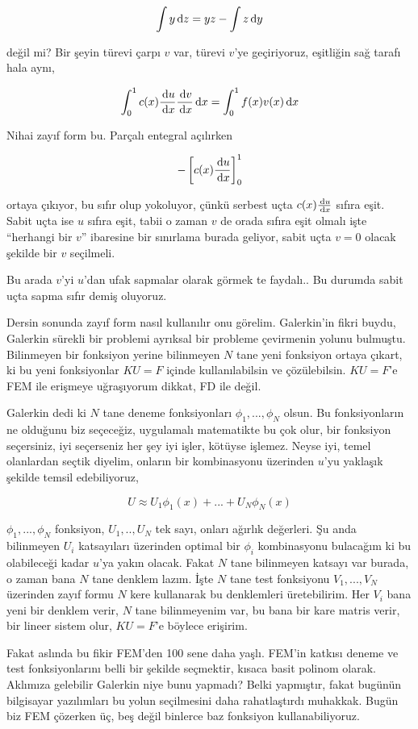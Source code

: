 \documentclass[12pt,fleqn]{article}\usepackage{../../common}
\begin{document}
$$ \int y \,\mathrm{d} z = y  z - \int z \,\mathrm{d} y $$

değil mi? Bir şeyin türevi çarpı $v$ var, türevi $v$'ye geçiriyoruz, eşitliğin
sağ tarafı hala aynı,

$$
\int _{0}^{1} c(x) \frac{\,\mathrm{d} u}{\,\mathrm{d} x} \frac{\,\mathrm{d} v}{\,\mathrm{d} x} \,\mathrm{d} x =
\int_{0}^{1} f(x) v(x) \,\mathrm{d} x
$$

Nihai zayıf form bu. Parçalı entegral açılırken

$$
- \left[ c(x) \frac{\,\mathrm{d} u}{\,\mathrm{d} x}  \right]_{0}^{1}
$$

ortaya çıkıyor, bu sıfır olup yokoluyor, çünkü serbest uçta $c(x) \frac{\,\mathrm{d} u}{\,\mathrm{d} x}$
sıfıra eşit. Sabit uçta ise $u$ sıfıra eşit, tabii o zaman $v$ de orada sıfıra
eşit olmalı işte ``herhangi bir $v$'' ibaresine bir sınırlama burada geliyor,
sabit uçta $v=0$ olacak şekilde bir $v$ seçilmeli.

Bu arada $v$'yi $u$'dan ufak sapmalar olarak görmek te faydalı.. Bu durumda
sabit uçta sapma sıfır demiş oluyoruz.

Dersin sonunda zayıf form nasıl kullanılır onu görelim. Galerkin'in fikri buydu,
Galerkin sürekli bir problemi ayrıksal bir probleme çevirmenin yolunu bulmuştu.
Bilinmeyen bir fonksiyon yerine bilinmeyen $N$ tane yeni fonksiyon ortaya
çıkart, ki bu yeni fonksiyonlar $KU = F$ içinde kullanılabilsin ve çözülebilsin.
$KU=F$'e FEM ile erişmeye uğraşıyorum dikkat, FD ile değil.

Galerkin dedi ki $N$ tane deneme fonksiyonları $\phi_1,...,\phi_N$ olsun. Bu
fonksiyonların ne olduğunu biz seçeceğiz, uygulamalı matematikte bu çok olur,
bir fonksiyon seçersiniz, iyi seçerseniz her şey iyi işler, kötüyse işlemez.
Neyse iyi, temel olanlardan seçtik diyelim, onların bir kombinasyonu üzerinden
$u$'yu yaklaşık şekilde temsil edebiliyoruz,

$$
U \approx U_1 \phi_1(x) + ... + U_N \phi_N(x)
$$

$\phi_1,...,\phi_N$ fonksiyon, $U_1,..,U_N$ tek sayı, onları ağırlık değerleri.
Şu anda bilinmeyen $U_i$ katsayıları üzerinden optimal bir $\phi_i$ kombinasyonu
bulacağım ki bu olabileceği kadar $u$'ya yakın olacak. Fakat $N$ tane bilinmeyen
katsayı var burada, o zaman bana $N$ tane denklem lazım. İşte $N$ tane test
fonksiyonu $V_1,...,V_N$ üzerinden zayıf formu $N$ kere kullanarak bu
denklemleri üretebilirim. Her $V_i$ bana yeni bir denklem verir, $N$ tane
bilinmeyenim var, bu bana bir kare matris verir, bir lineer sistem olur, 
$KU = F$'e böylece erişirim.

Fakat aslında bu fikir FEM'den 100 sene daha yaşlı. FEM'in katkısı deneme ve
test fonksiyonlarını belli bir şekilde seçmektir, kısaca basit polinom
olarak. Aklımıza gelebilir Galerkin niye bunu yapmadı? Belki yapmıştır, fakat
bugünün bilgisayar yazılımları bu yolun seçilmesini daha rahatlaştırdı muhakkak.
Bugün biz FEM çözerken üç, beş değil binlerce baz fonksiyon kullanabiliyoruz.
\end{document}

